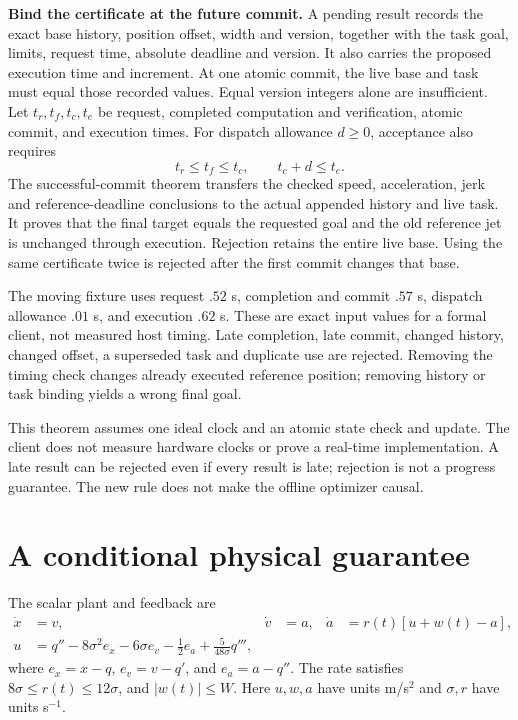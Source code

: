 \documentclass[10pt,letterpaper]{article}
\begin{document}
\textbf{Bind the certificate at the future commit.}
A pending result records the exact base history, position offset, width and
version, together with the task goal, limits, request time, absolute deadline
and version. It also carries the proposed execution time and increment.
At one atomic commit, the live base and task must equal those recorded values.
Equal version integers alone are insufficient. Let $t_r,t_f,t_c,t_e$ be request,
completed computation and verification, atomic commit, and execution times.
For dispatch allowance $d\geq0$, acceptance also requires
\[
 t_r\leq t_f\leq t_c,\qquad t_c+d\leq t_e.
\]
The successful-commit theorem transfers the checked speed, acceleration, jerk
and reference-deadline conclusions to the actual appended history and live task.
It proves that the final target equals the requested goal and the old reference
jet is unchanged through execution. Rejection retains the entire live base.
Using the same certificate twice is rejected after the first commit changes
that base.

The moving fixture uses request $.52$ s, completion and commit $.57$ s,
dispatch allowance $.01$ s, and execution $.62$ s. These are exact input values
for a formal client, not measured host timing. Late completion, late commit,
changed history, changed offset, a superseded task and duplicate use are
rejected. Removing the timing check changes already executed reference position;
removing history or task binding yields a wrong final goal.

This theorem assumes one ideal clock and an atomic state check and update.
The client does not measure hardware clocks or prove a real-time implementation.
A late result can be rejected even if every result is late; rejection is not a
progress guarantee. The new rule does not make the offline optimizer causal.

\section{A conditional physical guarantee}
The scalar plant and feedback are
\begin{align}
 \dot x&=v,& \dot v&=a,& \dot a&=r(t)[u+w(t)-a],\label{eq:plant}\\
 u&=q''-8\sigma^2e_x-6\sigma e_v-\tfrac12e_a
       +\frac5{48\sigma}q''',\label{eq:feedback}
\end{align}
where $e_x=x-q$, $e_v=v-q'$, and $e_a=a-q''$. The rate satisfies
$8\sigma\leq r(t)\leq12\sigma$, and $|w(t)|\leq W$. Here $u,w,a$ have units
m/s$^2$ and $\sigma,r$ have units s$^{-1}$.
\end{document}
